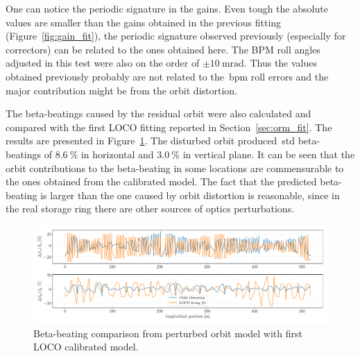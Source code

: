 One can notice the periodic signature in the gains. Even tough the absolute values are smaller than the gains obtained in the previous fitting (Figure~\ref{fig:gain_fit}), the periodic signature observed previously (especially for correctors) can be related to the ones obtained here. The BPM roll angles adjusted in this test were also on the order of $\pm\SI{10}{\milli\radian}$. Thus the values obtained previously probably are not related to the~\gls{bpm} roll errors and the major contribution might be from the orbit distortion.

The beta-beatings caused by the residual orbit were also calculated and compared with the first LOCO fitting reported in Section~\ref{sec:orm_fit}. The results are presented in Figure~\ref{fig:beta_beating_orb}. The disturbed orbit produced~\gls{std} beta-beatings of $\SI{8.6}{\%}$ in horizontal and $\SI{3.0}{\%}$ in vertical plane. It can be seen that the orbit contributions to the beta-beating in some locations are commensurable to the ones obtained from the calibrated model. The fact that the predicted beta-beating is larger than the one caused by orbit distortion is reasonable, since in the real storage ring there are other sources of optics perturbations. 
\begin{figure}
\centering
\includegraphics[width=1.0\textwidth]{figures/beta_beating_orbit_loco_iter0.pdf}
\caption{Beta-beating comparison from perturbed orbit model with first LOCO calibrated model.}
\label{fig:beta_beating_orb}
\end{figure}

